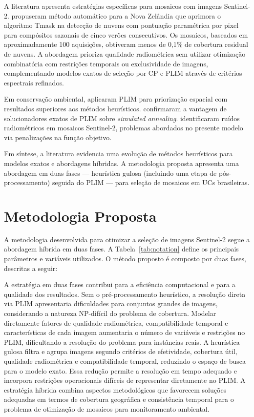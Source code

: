 \documentclass[a4paper,11pt]{article}
\begin{document}
A literatura apresenta estratégias específicas para mosaicos com imagens Sentinel-2. \citet{shepherd2020automated} propuseram método automático para a Nova Zelândia que aprimora o algoritmo Tmask na detecção de nuvens com pontuação paramétrica por pixel para compósitos sazonais de cinco verões consecutivos. Os mosaicos, baseados em aproximadamente 100 aquisições, obtiveram menos de 0,1\% de cobertura residual de nuvens. A abordagem prioriza qualidade radiométrica sem utilizar otimização combinatória com restrições temporais ou exclusividade de imagens, complementando modelos exatos de seleção por CP e PLIM \citep{combarro-simon-constraint-2023} através de critérios espectrais refinados.

Em conservação ambiental, \citet{beyer:2016} aplicaram PLIM para priorização espacial com resultados superiores aos métodos heurísticos. \citet{schuster:2020} confirmaram a vantagem de solucionadores exatos de PLIM sobre \textit{simulated annealing}. \citet{rodriguez-puerta:2024} identificaram ruídos radiométricos em mosaicos Sentinel-2, problemas abordados no presente modelo via penalizações na função objetivo.

Em síntese, a literatura evidencia uma evolução de métodos heurísticos para modelos exatos e abordagens híbridas. A metodologia proposta apresenta uma abordagem em duas fases --- heurística gulosa (incluindo uma etapa de pós-processamento) seguida do PLIM --- para seleção de mosaicos em UCs brasileiras.

\vspace{-7mm}

\section{Metodologia Proposta}
\vspace{-5mm}
A metodologia desenvolvida para otimizar a seleção de imagens Sentinel-2 segue a abordagem híbrida em duas fases. A Tabela~\ref{tab:notation} define os principais parâmetros e variáveis utilizados. O método proposto é composto por duas fases, descritas a seguir:

A estratégia em duas fases contribui para a eficiência computacional e para a qualidade dos resultados. Sem o pré-processamento heurístico, a resolução direta via PLIM apresentaria dificuldades para conjuntos grandes de imagens, considerando a natureza NP-difícil do problema de cobertura. Modelar diretamente fatores de qualidade radiométrica, compatibilidade temporal e características de cada imagem aumentaria o número de variáveis e restrições no PLIM, dificultando a resolução do problema para instâncias reais. A heurística gulosa filtra e agrupa imagens segundo critérios de efetividade, cobertura útil, qualidade radiométrica e compatibilidade temporal, reduzindo o espaço de busca para o modelo exato. Essa redução permite a resolução em tempo adequado e incorpora restrições operacionais difíceis de representar diretamente no PLIM. A estratégia híbrida combina aspectos metodológicos que favorecem soluções adequadas em termos de cobertura geográfica e consistência temporal para o problema de otimização de mosaicos para monitoramento ambiental.
\vspace{-4mm}
\end{document}
